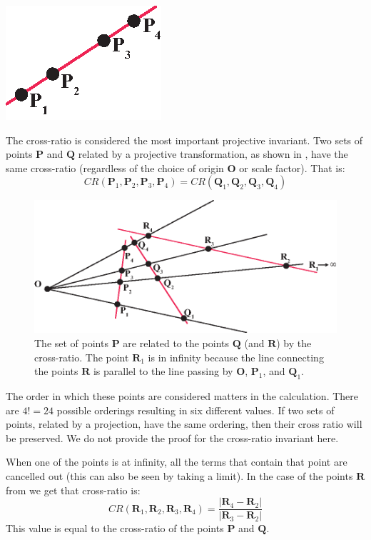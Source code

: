 \centerline{
\includegraphics[width=.25\linewidth]{figures/single_view_3d/4_colinear_points.eps}
}

The cross-ratio is considered the most important projective invariant. Two sets of points $\mathbf{P}$ and $\mathbf{Q}$ related by a projective transformation, as shown in \fig{\ref{fig:cross_ratio_description}}, have the same cross-ratio (regardless of the choice of origin $\mathbf{O}$ or scale factor). That is:
\begin{equation}
CR(\mathbf{P}_1,\mathbf{P}_2,\mathbf{P}_3,\mathbf{P}_4) = CR(\mathbf{Q}_1,\mathbf{Q}_2,\mathbf{Q}_3,\mathbf{Q}_4)
\end{equation}


\begin{figure}
\centerline{
\includegraphics[width=.9\linewidth]{figures/single_view_3d/cross_ratio_description2.eps}
} 
\caption{The set of points $\mathbf{P}$ are related to the points $\mathbf{Q}$ (and $\mathbf{R}$) by the cross-ratio. The point $\mathbf{R}_1$ is in infinity because the line connecting the points $\mathbf{R}$ is parallel to the line passing by $\mathbf{O}$, $\mathbf{P}_1$, and $\mathbf{Q}_1$.}
\label{fig:cross_ratio_description}
\end{figure}

The order in which these points are considered matters in the calculation. There are $4!=24$ possible orderings resulting in six different values. If two sets of points, related by a projection, have the same ordering, then their cross ratio will be preserved. We do not provide the proof for the cross-ratio invariant here. 

When one of the points is at infinity, all the terms that contain that point are cancelled out (this can also be seen by taking a limit). In the case of the points $\mathbf{R}$ from \fig{\ref{fig:cross_ratio_description}} we get that cross-ratio is:
\begin{equation}
CR(\mathbf{R}_1,\mathbf{R}_2,\mathbf{R}_3,\mathbf{R}_4) = 
\frac{\left| \mathbf{R}_4 -\mathbf{R}_2 \right| }
{ \left| \mathbf{R}_3 -\mathbf{R}_2 \right|}
\end{equation}
This value is equal to the cross-ratio of the points $\mathbf{P}$ and $\mathbf{Q}$.

